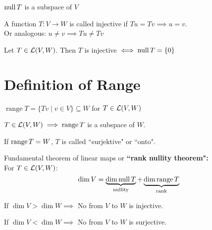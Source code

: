 \setcounter{thm}{12}
\begin{thm}
    $\operatorname{null} T$ is a subspace of $V$
\end{thm}

\setcounter{thm}{13}
\begin{mydef}
    A function $T: V \to W$ is called injective if $Tu = Tv \implies u = v$. \\
Or analogous: $u \neq v \implies Tu \neq Tv$
\end{mydef}

\setcounter{thm}{14}
\begin{mydef}
    Let $T \in {\mathcal{L}(V,W)}$. Then $T$ is injective $\iff \operatorname{null} T = \{0 \}$
\end{mydef}

\section{Definition of Range}
\setcounter{thm}{15}
\begin{thm}
    $\operatorname{range}T= \{Tv \mid v \in V\} \subseteq W$ for $T \in {\mathcal{L}(V,W)}$
\end{thm}

\setcounter{thm}{17}
\begin{thm}
    $T\in {\mathcal{L}(V,W)} \implies \operatorname{range} T$ is a subspace of $W$.
\end{thm}

\setcounter{thm}{18}
\begin{mydef}
    If $\operatorname{range} T=W$, $T$ is called ``surjektive" or ``onto".
\end{mydef}

\setcounter{thm}{20}
\begin{thm}
    \label{rank-nullity-theorem}
    Fundamental theorem of linear maps or \textbf{``rank nullity theorem":} \\
    For $T \in {\mathcal{L}(V,W)}$:
    \begin{equation}
    	\dim V =
    	\underbrace{ \dim \operatorname{null} T }_{\text{nullity}}
    	+ \underbrace{\dim \operatorname{range} T}_{\text{rank}}
    \end{equation}
\end{thm}

\setcounter{thm}{21}
\begin{thm}
    If $\dim V > \dim W \implies$ No \lm from $V$ to $W$ is injective.
\end{thm}

\setcounter{thm}{23}
\begin{thm}
    If $\dim V < \dim W \implies$ No \lm from $V$ to $W$ is surjective.
\end{thm}

